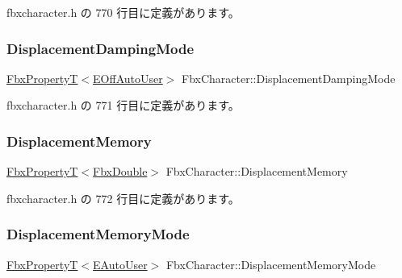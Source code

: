  fbxcharacter.\+h の 770 行目に定義があります。

\mbox{\label{class_fbx_character_a52f89eade66ff10d523f56b2b6a9ca01}} 
\subsubsection{\texorpdfstring{Displacement\+Damping\+Mode}{DisplacementDampingMode}}
{\footnotesize\ttfamily \hyperlink{class_fbx_property_t}{Fbx\+PropertyT}$<$\hyperlink{class_fbx_character_ab698a180e6f900ba8317257749c2ecce}{E\+Off\+Auto\+User}$>$ Fbx\+Character\+::\+Displacement\+Damping\+Mode}



 fbxcharacter.\+h の 771 行目に定義があります。

\mbox{\label{class_fbx_character_a660e7aa3be757e6f1309cf95bde539d7}} 
\subsubsection{\texorpdfstring{Displacement\+Memory}{DisplacementMemory}}
{\footnotesize\ttfamily \hyperlink{class_fbx_property_t}{Fbx\+PropertyT}$<$\hyperlink{fbxtypes_8h_a171e72a1c46fc15c1a6c9c31948c1c5b}{Fbx\+Double}$>$ Fbx\+Character\+::\+Displacement\+Memory}



 fbxcharacter.\+h の 772 行目に定義があります。

\mbox{\label{class_fbx_character_a73c80aa7582bf31b0b87fa1a138a82c0}} 
\subsubsection{\texorpdfstring{Displacement\+Memory\+Mode}{DisplacementMemoryMode}}
{\footnotesize\ttfamily \hyperlink{class_fbx_property_t}{Fbx\+PropertyT}$<$\hyperlink{class_fbx_character_a5b03462709a82a15d89ee4563a4c49df}{E\+Auto\+User}$>$ Fbx\+Character\+::\+Displacement\+Memory\+Mode}



